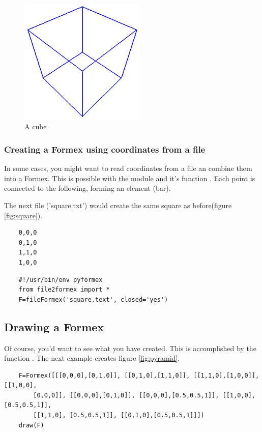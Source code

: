 \begin{figure}[ht]
  \centering
  \begin{makeimage}
  \end{makeimage}
  \begin{latexonly}
    \includegraphics[width=6cm]{images/cube}
  \end{latexonly}
  \begin{htmlonly}
  \end{htmlonly}  
  \caption{A cube}
  \label{fig:cube}
\end{figure}


\subsubsection{Creating a Formex using coordinates from a file}
\outdated

In some cases, you might want to read coordinates from a file an combine them into a Formex. This is possible with the module  and it's function . Each point is connected to the following, forming an element (bar).

The next file ('square.txt') would create the same square as before(figure \ref{fig:square}).
\begin{verbatim}
	0,0,0
	0,1,0
	1,1,0
	1,0,0
\end{verbatim}
\begin{verbatim}
	#!/usr/bin/env pyformex
	from file2formex import *
	F=fileFormex('square.text', closed='yes')
\end{verbatim}


\subsection{Drawing a Formex}
\outdated

\label{subsec:drawing}
Of course, you'd want to see what you have created. This is accomplished by the function . The next example creates figure \ref{fig:pyramid}. 
\begin{verbatim}
	F=Formex([[[0,0,0],[0,1,0]], [[0,1,0],[1,1,0]], [[1,1,0],[1,0,0]], [[1,0,0], 
		[0,0,0]], [[0,0,0],[0,1,0]], [[0,0,0],[0.5,0.5,1]], [[1,0,0],[0.5,0.5,1]], 
		[[1,1,0], [0.5,0.5,1]], [[0,1,0],[0.5,0.5,1]]])
	draw(F)
\end{verbatim}

